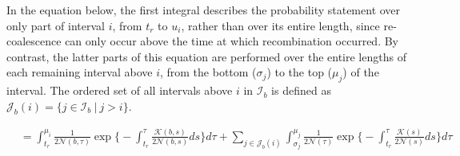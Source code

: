 \documentclass[11pt]{article}
\begin{document}
In the equation below, the first integral describes the probability statement
over only part of interval $i$, from $t_r$ to $u_i$, rather than over its entire 
length, since re-coalescence can only occur above the time at which recombination 
occurred. By contrast, the latter parts of this equation are performed over the
entire lengths of each remaining interval above $i$, from the 
bottom ($\sigma_j$) to the top ($\mu_j$) of the interval.
The ordered set of all intervals above $i$ in $\mathcal{I}_b$ 
is defined as $\mathcal{J}_b(i) = \{j \in \mathcal{I}_b ~|~ j > i \}$. 

\begin{equation}
\begin{aligned}
	&= \int_{t_r}^{\mu_i}
		\frac{1}{2\mathcal{N}(b,\tau)} \exp 
			\bigg\{
				-\int_{t_r}^{\tau} \frac{\mathcal{K}(b,s)}{2\mathcal{N}(b,s)}ds
			\bigg\} d\tau + 
			\sum_{j \in \mathcal{J}_b(i)}
			\int_{\sigma_j}^{\mu_j}
			\frac{1}{2\mathcal{N}(\tau)} \exp 
			\bigg\{
				-\int_{t_r}^{\tau}
				\frac{\mathcal{K}(s)}{2\mathcal{N}(s)}ds
			\bigg\} d\tau\\
\end{aligned}			
\end{equation}







\end{document}
